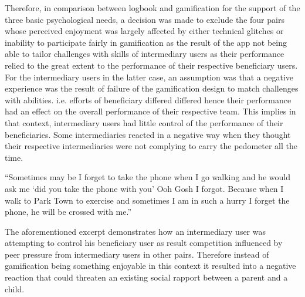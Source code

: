 Therefore, in comparison between logbook and gamification for the support of the three basic psychological needs, a decision was made to exclude the four pairs whose perceived enjoyment was largely affected by either technical glitches or inability to participate fairly in gamification as the result of the app not being able to tailor challenges with skills of intermediary users as their performance relied to the great extent to the performance of their respective beneficiary users. For the intermediary users in the latter case, an assumption was that a negative experience was the result of failure of the gamification design to match challenges with abilities. i.e. efforts of beneficiary differed differed hence their performance had an effect on the overall performance of their respective team. This implies in that context, intermediary users had little control of the performance of their beneficiaries. Some intermediaries reacted in a negative way when they thought their respective intermediaries were not complying to carry the pedometer all the time.

 {``Sometimes may be I forget to take the phone when I go walking and he would ask me `did you take the phone with you' Ooh Gosh I forgot.  Because when I walk to Park Town to exercise and sometimes  I am in such a hurry I forget the phone, he will be crossed with me.''} 

The aforementioned excerpt demonstrates how an intermediary user was attempting to control his beneficiary user as result competition influenced by peer pressure from intermediary users in other pairs. Therefore instead of gamification being something enjoyable in this context it resulted into a negative reaction that could threaten an existing social rapport between a parent and a child.

